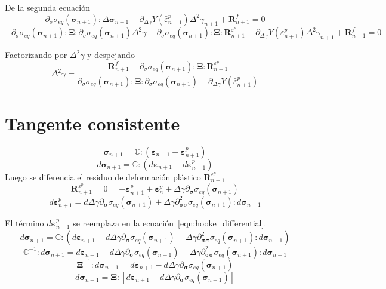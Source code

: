 \documentclass[12pt]{article}
\begin{document}
De la segunda ecuación
\[ \partial_{\sigma}\sigma_{eq}\left(\pmb{\sigma}_{n+1}\right):\Delta\pmb{\sigma}_{n+1} - \partial_{\Delta\gamma}Y\left(\bar\varepsilon^p_{n+1}\right)\Delta^2\gamma_{n+1} + \pmb{R}_{n+1}^{f} = 0\]
\[ -\partial_{\sigma}\sigma_{eq}\left(\pmb{\sigma}_{n+1}\right):\pmb{\Xi}:\partial_{\sigma}\sigma_{eq}\left(\pmb{\sigma}_{n+1}\right)\Delta^2\gamma
   -\partial_{\sigma}\sigma_{eq}\left(\pmb{\sigma}_{n+1}\right):\pmb{\Xi}:\pmb{R}_{n+1}^{\varepsilon^p} 
   - \partial_{\Delta\gamma}Y\left(\bar\varepsilon^p_{n+1}\right)\Delta^2\gamma_{n+1} + \pmb{R}_{n+1}^{f} = 0\]

Factorizando por $\Delta^2\gamma$ y despejando
\[
\Delta^2\gamma = \frac{\pmb{R}_{n+1}^{f} - \partial_{\sigma}\sigma_{eq}\left(\pmb{\sigma}_{n+1}\right):\pmb{\Xi}:\pmb{R}_{n+1}^{\varepsilon^p}}
{\partial_{\sigma}\sigma_{eq}\left(\pmb{\sigma}_{n+1}\right):\pmb{\Xi}:\partial_{\sigma}\sigma_{eq}\left(\pmb{\sigma}_{n+1}\right) + \partial_{\Delta\gamma}Y\left(\bar\varepsilon^p_{n+1}\right)}
\]


\section*{Tangente consistente}
\[\pmb{\sigma}_{n+1} = \mathbb{C}:\left(\pmb{\varepsilon}_{n+1} - \pmb{\varepsilon}_{n+1}^p\right) \]
\begin{equation} \label{eqn:hooke_differential}
    d\pmb{\sigma}_{n+1} = \mathbb{C}:\left(d\pmb{\varepsilon}_{n+1} - d\pmb{\varepsilon}_{n+1}^p\right)
\end{equation}
Luego se diferencia el residuo de deformación plástico $\pmb{R}_{n+1}^{\varepsilon^p}$
\[\pmb{R}_{n+1}^{\varepsilon^p} = 0 = -\pmb{\varepsilon}_{n+1}^p + \pmb{\varepsilon}_{n}^p + \Delta\gamma\partial_{\pmb{\sigma}}\sigma_{eq}\left(\pmb{\sigma}_{n+1}\right) \]
\[d\pmb{\varepsilon}_{n+1}^p = d\Delta\gamma\partial_{\pmb{\sigma}}\sigma_{eq}\left(\pmb{\sigma}_{n+1}\right) + \Delta\gamma\partial_{\pmb{\sigma}\pmb{\sigma}}^2 \sigma_{eq}\left(\pmb{\sigma}_{n+1}\right) : d\pmb{\sigma}_{n+1} \]

El término $d\pmb{\varepsilon}_{n+1}^p$ se reemplaza en la ecuación~\ref{eqn:hooke_differential}. 
\[d\pmb{\sigma}_{n+1} = \mathbb{C}:\left(d\pmb{\varepsilon}_{n+1} - d\Delta\gamma\partial_{\pmb{\sigma}}\sigma_{eq}\left(\pmb{\sigma}_{n+1}\right) - \Delta\gamma\partial_{\pmb{\sigma}\pmb{\sigma}}^2 \sigma_{eq}\left(\pmb{\sigma}_{n+1}\right) : d\pmb{\sigma}_{n+1}\right)\]
\[\mathbb{C}^{-1}:d\pmb{\sigma}_{n+1} = d\pmb{\varepsilon}_{n+1} - d\Delta\gamma\partial_{\pmb{\sigma}}\sigma_{eq}\left(\pmb{\sigma}_{n+1}\right) - \Delta\gamma\partial_{\pmb{\sigma}\pmb{\sigma}}^2 \sigma_{eq}\left(\pmb{\sigma}_{n+1}\right) : d\pmb{\sigma}_{n+1}\]
\[\pmb{\Xi}^{-1}:d\pmb{\sigma}_{n+1} = d\pmb{\varepsilon}_{n+1} - d\Delta\gamma\partial_{\pmb{\sigma}}\sigma_{eq}\left(\pmb{\sigma}_{n+1}\right)\]
\[d\pmb{\sigma}_{n+1} = \pmb{\Xi}:\left[d\pmb{\varepsilon}_{n+1} - d\Delta\gamma\partial_{\pmb{\sigma}}\sigma_{eq}\left(\pmb{\sigma}_{n+1}\right)\right]\]
\end{document}
